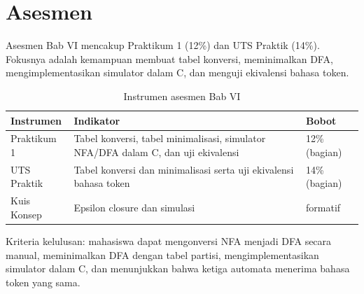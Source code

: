 \section*{Asesmen}

Asesmen Bab VI mencakup Praktikum 1 (12\%) dan UTS Praktik (14\%).
Fokusnya adalah kemampuan membuat tabel konversi, meminimalkan DFA,
mengimplementasikan simulator dalam C, dan menguji ekivalensi bahasa
token.

\begin{table}[H]
\centering
\caption{Instrumen asesmen Bab VI}
\label{tab:ch06-asesmen}
\begin{tabularx}{\textwidth}{@{}lXl@{}}
\toprule
\textbf{Instrumen} & \textbf{Indikator} & \textbf{Bobot} \\
\midrule
Praktikum 1 & Tabel konversi, tabel minimalisasi, simulator NFA/DFA
dalam C, dan uji ekivalensi & 12\% (bagian) \\
UTS Praktik & Tabel konversi dan minimalisasi serta uji ekivalensi
bahasa token & 14\% (bagian) \\
Kuis Konsep & Epsilon closure dan simulasi & formatif \\
\bottomrule
\end{tabularx}
\end{table}

Kriteria kelulusan: mahasiswa dapat mengonversi NFA menjadi DFA secara
manual, meminimalkan DFA dengan tabel partisi, mengimplementasikan
simulator dalam C, dan menunjukkan bahwa ketiga automata menerima
bahasa token yang sama.
